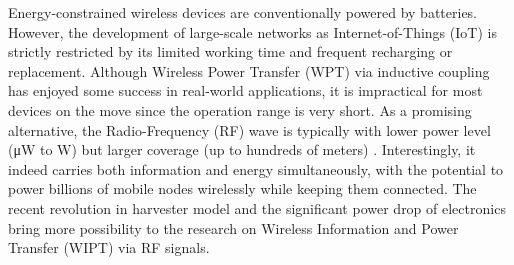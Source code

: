 Energy-constrained wireless devices are conventionally powered by batteries. However, the development of large-scale networks as Internet-of-Things (IoT) is strictly restricted by its limited working time and frequent recharging or replacement. Although Wireless Power Transfer (WPT) via inductive coupling has enjoyed some success in real-world applications, it is impractical for most devices on the move since the operation range is very short. As a promising alternative, the Radio-Frequency (RF) wave is typically with lower power level (\si{\uW} to \si{W}) but larger coverage (up to hundreds of meters) \cite{Ng2019}. Interestingly, it indeed carries both information and energy simultaneously, with the potential to power billions of mobile nodes wirelessly while keeping them connected. The recent revolution in harvester model and the significant power drop of electronics bring more possibility to the research on Wireless Information and Power Transfer (WIPT) via RF signals.
